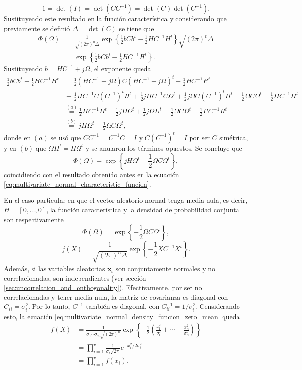 \documentclass[a4paper]{report}
\newcommand{\x}{\mathbf{x}}
\begin{document}
\[
 1=\det(I)=\det(CC^{-1})=\det(C)\det(C^{-1}).
\]
Sustituyendo este resultado en la función característica y considerando que previamente se definió  \(\Delta=\det(C)\) se tiene que
\begin{align*}
 \Phi(\Omega)&=\frac{1}{\sqrt{(2\pi)^n\Delta}}\exp\left\{\frac{1}{2}bCb^t-\frac{1}{2}HC^{-1}H^t\right\}\sqrt{(2\pi)^n\Delta}\\
   &=\exp\left\{\frac{1}{2}bCb^t-\frac{1}{2}HC^{-1}H^t\right\}.
\end{align*}
Sustituyendo \(b=HC^{-1}+j\Omega\), el exponente queda
\begin{align*}
 \frac{1}{2}bCb^t-\frac{1}{2}HC^{-1}H^t&=\frac{1}{2}(HC^{-1}+j\Omega)C(HC^{-1}+j\Omega)^t-\frac{1}{2}HC^{-1}H^t\\
  &=\frac{1}{2}HC^{-1}C(C^{-1})^tH^t+\frac{1}{2}jHC^{-1}C\Omega^t+\frac{1}{2}j\Omega C(C^{-1})^tH^t-\frac{1}{2}\Omega C\Omega^t-\frac{1}{2}HC^{-1}H^t\\
  &\overset{(a)}{=}\frac{1}{2}HC^{-1}H^t+\frac{1}{2}jH\Omega^t+\frac{1}{2}j\Omega H^t-\frac{1}{2}\Omega C\Omega^t-\frac{1}{2}HC^{-1}H^t\\
  &\overset{(b)}{=}jH\Omega^t-\frac{1}{2}\Omega C\Omega^t,
\end{align*}
donde en \((a)\) se usó que \(CC^{-1}=C^{-1}C=I\) y \(C(C^{-1})^t=I\) por ser \(C\) simétrica, y en \((b)\) que \(\Omega H^t=H\Omega^t\) y se anularon los términos opuestos. Se concluye que
\[
 \Phi(\Omega)=\exp\left\{jH\Omega^t-\frac{1}{2}\Omega C\Omega^t\right\},
\]
coincidiendo con el resultado obtenido antes en la ecuación \ref{eq:multivariate_normal_characteristic_funcion}.

En el caso particular en que el vector aleatorio normal tenga media nula, es decir, \(H=[0,\dots,0]\), la función característica y la densidad de probabilidad conjunta son respectivamente
\begin{equation}\label{eq:multivariate_normal_characteristic_funcion_zero_mean}
 \Phi(\Omega)=\exp\left\{-\frac{1}{2}\Omega C\Omega^t\right\},
\end{equation}
\begin{equation}\label{eq:multivariate_normal_density_funcion_zero_mean}
 f(X)=\frac{1}{\sqrt{(2\pi)^n\Delta}}\exp\left\{-\frac{1}{2}XC^{-1}X^t\right\}.
\end{equation}
Además, si las variables aleatorias \(\x_i\) son conjuntamente normales y no correlacionadas, son independientes (ver sección \ref{sec:uncorrelation_and_onthogonality}). Efectivamente, por ser no correlacionadas y tener media nula, la matriz de covarianza es diagonal con \(C_{ii}=\sigma_i^2\). Por lo tanto, \(C^{-1}\) también es diagonal, con \(C^{-1}_{ii}=1/\sigma_i^2\). Considerando esto, la ecuación \ref{eq:multivariate_normal_density_funcion_zero_mean} queda
\begin{align*}
 f(X)&=\frac{1}{\sigma_1\cdots\sigma_n\sqrt{(2\pi)^n}}\exp\left\{-\frac{1}{2}\left(\frac{x_1^2}{\sigma_1^2}+\cdots+\frac{x_n^2}{\sigma_n^2}\right)\right\}\\
  &=\prod_{i=1}^n\frac{1}{\sigma_i\sqrt{2\pi}}e^{-x_i^2/2\sigma_i^2}\\
  &=\prod_{i=1}^nf(x_i).
\end{align*}
\end{document}
